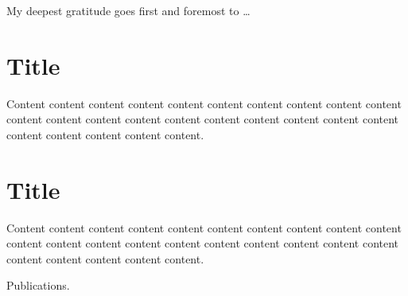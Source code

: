 \documentclass[degree=bachelor,language=english]{thuthesis}
\begin{document}
\begin{acknowledgements}
  My deepest gratitude goes first and foremost to …
\end{acknowledgements}


\statement


\appendix

\chapter{Title}

Content content content content content content content content content content content content content content content content content content content content content content content content content.




\chapter{Title}

Content content content content content content content content content content content content content content content content content content content content content content content content content.


\begin{resume}
  Publications.
\end{resume}


\clearpage
\OMIT
\end{document}

